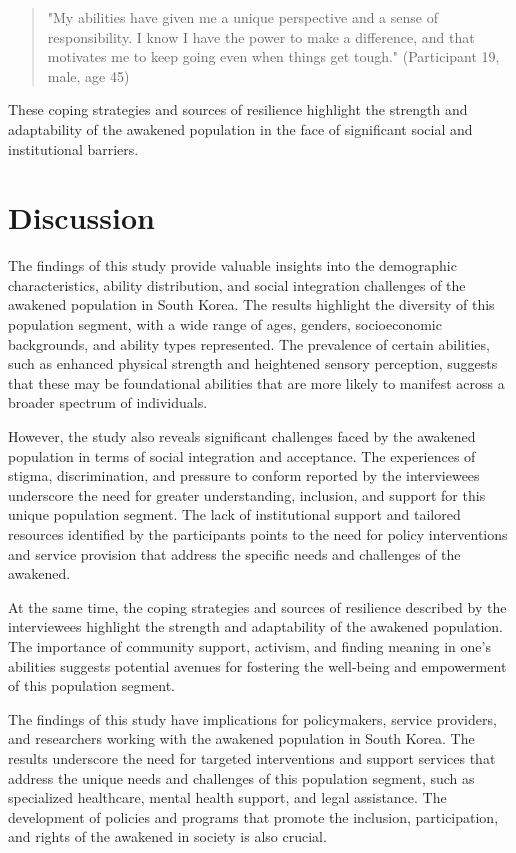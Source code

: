 \documentclass[12pt, a4paper]{article}
\begin{document}
\begin{quote}
    "My abilities have given me a unique perspective and a sense of responsibility. I know I have the power to make a difference, and that motivates me to keep going even when things get tough." (Participant 19, male, age 45)
\end{quote}

These coping strategies and sources of resilience highlight the strength and adaptability of the awakened population in the face of significant social and institutional barriers.

\section{Discussion}
The findings of this study provide valuable insights into the demographic characteristics, ability distribution, and social integration challenges of the awakened population in South Korea. The results highlight the diversity of this population segment, with a wide range of ages, genders, socioeconomic backgrounds, and ability types represented. The prevalence of certain abilities, such as enhanced physical strength and heightened sensory perception, suggests that these may be foundational abilities that are more likely to manifest across a broader spectrum of individuals.

However, the study also reveals significant challenges faced by the awakened population in terms of social integration and acceptance. The experiences of stigma, discrimination, and pressure to conform reported by the interviewees underscore the need for greater understanding, inclusion, and support for this unique population segment. The lack of institutional support and tailored resources identified by the participants points to the need for policy interventions and service provision that address the specific needs and challenges of the awakened.

At the same time, the coping strategies and sources of resilience described by the interviewees highlight the strength and adaptability of the awakened population. The importance of community support, activism, and finding meaning in one's abilities suggests potential avenues for fostering the well-being and empowerment of this population segment.

The findings of this study have implications for policymakers, service providers, and researchers working with the awakened population in South Korea. The results underscore the need for targeted interventions and support services that address the unique needs and challenges of this population segment, such as specialized healthcare, mental health support, and legal assistance. The development of policies and programs that promote the inclusion, participation, and rights of the awakened in society is also crucial.
\end{document}
